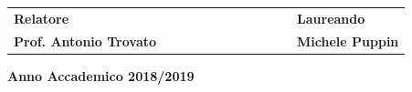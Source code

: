 \begin{titlepage}
\vspace{20mm}
\begin{spacing}{2}
\begin{tabular}{ l  c  c c c  cc c c c c  l }
{\Large{\bf Relatore}} &&&&&&&&&&& {\Large{\bf Laureando}}\\
{\Large{\bf Prof. Antonio Trovato}} &&&&&&&&&&& {\Large{\bf Michele Puppin}}\\
\end{tabular}
\end{spacing}
\vspace{15 mm}

\begin{center}
{\Large{\bf Anno Accademico 2018/2019}}
\end{center}
\end{titlepage}
\clearpage{\pagestyle{empty}\cleardoublepage}
